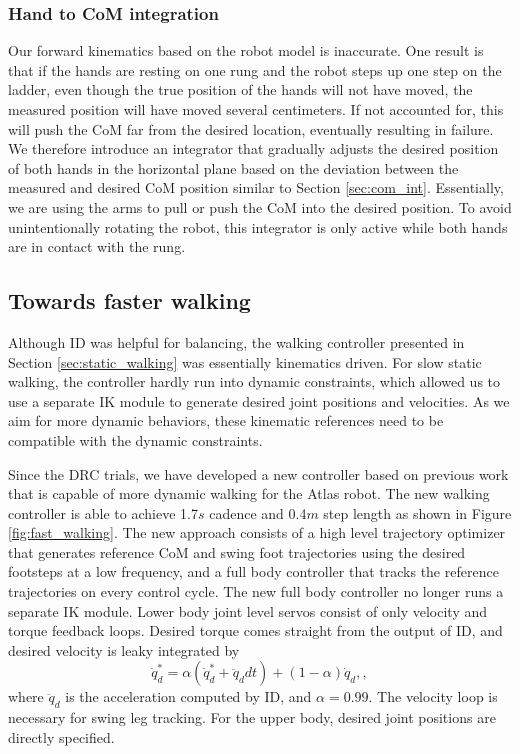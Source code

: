 \documentclass{ws-ijhr}
\newcommand{\fref}[1] {Figure \ref{#1}}
\newcommand{\sref}[1] {Section \ref{#1}}
\begin{document}
\subsubsection{Hand to CoM integration}
Our forward kinematics based on the robot model is inaccurate. 
One result is that if 
the hands are resting on one rung and the robot steps up one step on the 
ladder, even though the true position of the hands will not have moved, the 
measured position will have moved several centimeters. If not accounted for, 
this will push the CoM far from the desired location, eventually resulting 
in failure. We therefore introduce an integrator that gradually adjusts the 
desired position of both hands in the horizontal plane based on the deviation 
between the measured and desired CoM position similar to \sref{sec:com_int}. 
Essentially, we are using the 
arms to pull or push the CoM into the desired position. To avoid unintentionally 
rotating the robot, this integrator is only active while both hands are in 
contact with the rung. 

\subsection{Towards faster walking}
Although ID was helpful for balancing, the walking controller presented in 
\sref{sec:static_walking} was essentially kinematics driven. 
For slow static walking, the controller hardly run into dynamic constraints, 
which allowed us to use a separate IK module to generate desired joint 
positions and velocities. 
As we aim for more dynamic behaviors, these kinematic references need to be 
compatible with the dynamic constraints. 

Since the DRC trials, we have developed a new controller based on previous 
work \cite{sfeng_online} that is capable of more dynamic walking for the Atlas
robot. The new walking controller is able to achieve 1.7$s$ cadence and 0.4$m$
step length as shown in \fref{fig:fast_walking}. 
The new approach consists of a high level trajectory optimizer that generates
reference CoM and swing foot trajectories using the desired footsteps at a low
frequency, and a full body controller that tracks the reference trajectories 
on every control cycle. 
The new full body controller no longer runs a separate IK module. 
Lower body joint level servos consist of only velocity and torque feedback 
loops. 
Desired torque comes straight from the output of ID, and desired velocity is 
leaky integrated by
\begin{equation}
  \dot{q}_d^* = \alpha (\dot{q}_d^* + \ddot{q}_d dt) + (1-\alpha) \dot{q}_d,
	\label{eq:qd_int},
\end{equation} 
where $\ddot{q}_d$ is the acceleration computed by ID, and $\alpha = 0.99$. 
The velocity loop is necessary for swing leg tracking. 
For the upper body, desired joint positions are directly specified.
\end{document}
